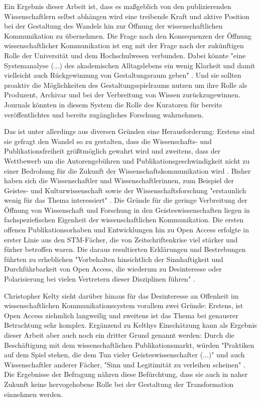 Ein Ergebnis dieser Arbeit ist, dass es maßgeblich von den publizierenden Wissenschaftlern selbst abhängen wird eine treibende Kraft und aktive Position bei der Gestaltung des Wandels hin zur Öffnung der wissenschaftlichen Kommunikation zu übernehmen. Die Frage nach den Konsequenzen der Öffnung wissenschaftlicher Kommunikation ist eng mit der Frage nach der zukünftigen Rolle der Universität und dem Hochschulwesen verbunden. Dabei könnte "eine Systemanalyse (...) des akademischen Alltagslebens ein wenig Klarheit und damit vielleicht auch Rückgewinnung von Ge­staltungsraum geben" \cite{Warnke_2012}. Und sie sollten proaktiv die Möglichkeiten des Gestaltungsspielraums nutzen um ihre Rolle als Produzent, Archivar und bei der Verbreitung von Wissen zurückzugewinnen. Journals könnten in diesem System die Rolle des Kuratoren für bereits veröffentlichtes und bereits zugängliches Forschung wahrnehmen.

Das ist unter allerdings aus diversen Gründen eine Herausforderung: Erstens sind sie gefragt den Wandel so zu gestalten, dass die Wissenschafts- und Publikationsfreiheit größtmöglich gewahrt wird und zweitens, dass der Wettbewerb um die Autorengebühren und Publikationsgeschwindigkeit nicht zu einer Bedrohung für die Zukunft der Wissenschaftskommunikation wird \cite{Beall_2012}. Bisher haben sich die Wissenschaftler und Wissenschaftlerinnen, zum Beispiel der Geistes- und Kulturwissenschaft sowie der Wissenschaftsforschung "erstaunlich wenig für das Thema interessiert" \cite{hagner_2015_sache_buches}. Die Gründe für die geringe Verbreitung der Öffnung von Wissenschaft und Forschung in den Geisteswissenschaften liegen in fachspeziefischen Eigenheit der wissenschaftlichen Kommunikation. Die ersten offenen Publikationsorhaben und Entwicklungen hin zu Open Access erfolgte in erster Linie aus den STM-Fächer, die von Zeitschriftenkrise viel stärker und fürher betroffen waren. Die daraus resultierten Erklärungen und Bestrebungen führten zu erheblichen "Vorbehalten hinsichtlich der Sinnhaftigkeit und Durchführbarkeit von Open Access, die wiederum zu Desinteresse oder Polarisierung bei vielen Vertretern dieser Disziplinen führen" \cite{naeder_2010_open}.

Christopher Kelty sieht darüber hinaus für das Desinteresse an Offenheit im wissenschaftlichen Kommunikationssystem vorallem zwei Gründe: Erstens, ist Open Access ziehmlich langweilig und zweitens ist das Thema bei genauerer Betrachtung sehr komplex. Ergänzend zu Kelthys Einschätzung kann als Ergebnis dieser Arbeit aber auch noch ein dritter Grund genannt werden: Durch die Beschäftigung mit dem wissenschaftlichen Publikationsmarkt, würden "Praktiken auf dem Spiel stehen, die dem Tun vieler Geisteswissenschafter (...)" und auch Wissenschaftler anderer Fächer, "Sinn und Legitimität zu verleihen scheinen" \cite{Hirschi_2015_buch_oa}. Die Ergebnisse der Befragung nähren diese Befürchtung, dass sie auch in naher Zukunft keine hervogehobene Rolle bei der Gestaltung der Transformation einnehmen werden.

